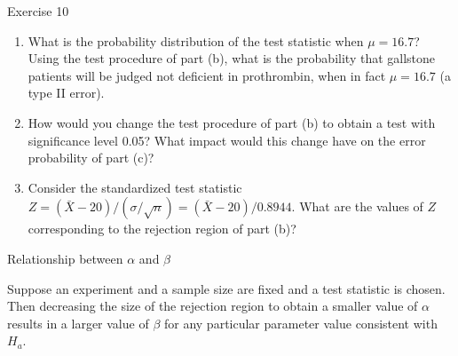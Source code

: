 \documentclass[
  ignorenonframetext,
]{beamer}
\providecommand{\tightlist}{%
  \setlength{\itemsep}{0pt}\setlength{\parskip}{0pt}}\usepackage{longtable,booktabs,array}
\begin{document}
\begin{frame}{Exercise 10}
\protect\hypertarget{exercise-10-1}{}
\begin{enumerate}[<+->]
[a.]
\setcounter{enumi}{2}
\tightlist
\item
  What is the probability distribution of the test statistic when
  \(\mu = 16.7\)? Using the test procedure of part (b), what is the
  probability that gallstone patients will be judged not deficient in
  prothrombin, when in fact \(\mu = 16.7\) (a type II error).
\item
  How would you change the test procedure of part (b) to obtain a test
  with significance level 0.05? What impact would this change have on
  the error probability of part (c)?
\item
  Consider the standardized test statistic
  \(Z = (\bar{X} - 20)/(\sigma/\sqrt{n}) = (\bar{X} - 20)/0.8944\). What
  are the values of \(Z\) corresponding to the rejection region of part
  (b)?
\end{enumerate}
\end{frame}

\begin{frame}{Relationship between \(\alpha\) and \(\beta\)}
\protect\hypertarget{relationship-between-alpha-and-beta}{}
\begin{tcolorbox}[enhanced jigsaw, left=2mm, breakable, bottomrule=.15mm, colframe=quarto-callout-important-color-frame, arc=.35mm, leftrule=.75mm, colbacktitle=quarto-callout-important-color!10!white, titlerule=0mm, opacityback=0, coltitle=black, opacitybacktitle=0.6, colback=white, toprule=.15mm, toptitle=1mm, bottomtitle=1mm, title=\textcolor{quarto-callout-important-color}{\faExclamation}\hspace{0.5em}{Proposition}, rightrule=.15mm]

Suppose an experiment and a sample size are fixed and a test statistic
is chosen. Then decreasing the size of the rejection region to obtain a
smaller value of \(\alpha\) results in a larger value of \(\beta\) for
any particular parameter value consistent with \(H_{a}\).

\end{tcolorbox}
\end{frame}
\end{document}
